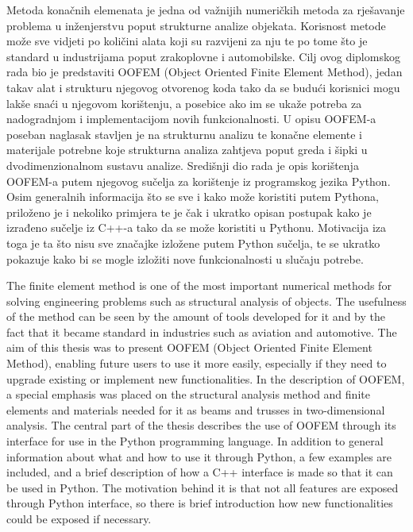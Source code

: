 \documentclass[a4paper,twoside,12pt]{memoir} %
\begin{document}
\begin{sazetak}
Metoda konačnih elemenata je jedna od važnijih numeričkih metoda za rješavanje problema u inženjerstvu poput strukturne analize objekata. Korisnost metode može sve vidjeti po količini alata koji su razvijeni za nju te po tome što je standard u industrijama poput zrakoplovne i automobilske. Cilj ovog diplomskog rada bio je predstaviti OOFEM (Object Oriented Finite Element Method), jedan takav alat i strukturu njegovog otvorenog koda tako da se budući korisnici mogu lakše snaći u njegovom korištenju, a posebice ako im se ukaže potreba za nadogradnjom i implementacijom novih funkcionalnosti. U opisu OOFEM-a poseban naglasak stavljen je na strukturnu analizu te konačne elemente i materijale potrebne koje strukturna analiza zahtjeva poput greda i šipki u dvodimenzionalnom sustavu analize. Središnji dio rada je opis korištenja OOFEM-a putem njegovog sučelja za korištenje iz programskog jezika Python.
Osim generalnih informacija što se sve i kako može koristiti putem Pythona, priloženo je i nekoliko primjera te je čak i ukratko opisan postupak kako je izrađeno sučelje iz C++-a tako da se može koristiti u Pythonu. Motivacija iza toga je ta što nisu sve značajke izložene putem Python sučelja, te se ukratko pokazuje kako bi se mogle izložiti nove funkcionalnosti u slučaju potrebe.
\end{sazetak}

\begin{summary}
The finite element method is one of the most important numerical methods for solving engineering problems such as structural analysis of objects. The usefulness of the method can be seen by the amount of tools developed for it and by the fact that it became standard in industries such as aviation and automotive. The aim of this thesis was to present OOFEM (Object Oriented Finite Element Method), enabling future users to use it more easily, especially if they need to upgrade existing or implement new functionalities. In the description of OOFEM, a special emphasis was placed on the structural analysis method and finite elements and materials needed for it as beams and trusses in two-dimensional analysis. The central part of the thesis describes the use of OOFEM through its interface for use in the Python programming language. In addition to general information about what and how to use it through Python, a few examples are included, and a brief description of how a C++ interface is made so that it can be used in Python. The motivation behind it is that not all features are exposed through Python interface, so there is brief introduction how new functionalities could be exposed if necessary.
\end{summary}
\end{document}
